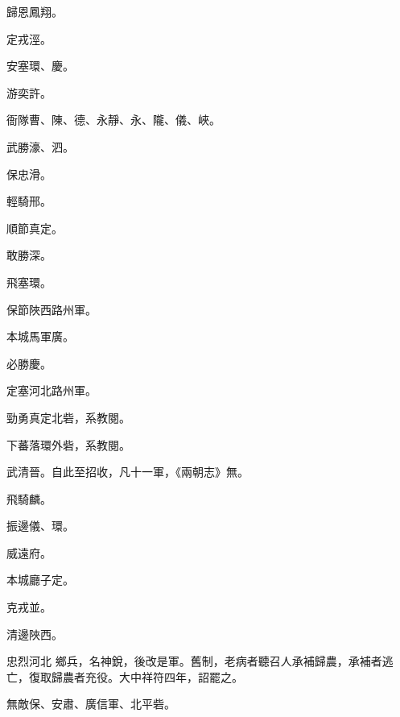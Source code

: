 \begin{pinyinscope}
 歸恩鳳翔。



 定戎涇。



 安塞環、慶。



 游奕許。



 衙隊曹、陳、德、永靜、永、隴、儀、峽。



 武勝濠、泗。



 保忠滑。



 輕騎邢。



 順節真定。



 敢勝深。



 飛塞環。



 保節陜西路州軍。



 本城馬軍廣。



 必勝慶。



 定塞河北路州軍。



 勁勇真定北砦，系教閱。



 下蕃落環外砦，系教閱。



 武清晉。自此至招收，凡十一軍，《兩朝志》無。



 飛騎麟。



 振邊儀、環。



 威遠府。



 本城廳子定。



 克戎並。



 清邊陜西。



 忠烈河北
 鄉兵，名神銳，後改是軍。舊制，老病者聽召人承補歸農，承補者逃亡，復取歸農者充役。大中祥符四年，詔罷之。



 無敵保、安肅、廣信軍、北平砦。




\end{pinyinscope}
